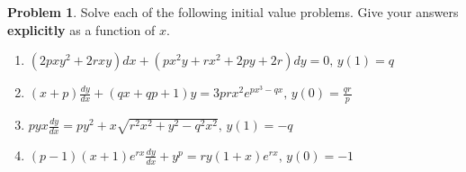 \documentclass[10pt]{article}
\theoremstyle{definition}
\newtheorem{problem}{Problem}
\begin{document}
\newpage
\begin{problem}
Solve each of the following initial value problems. Give your answers \textbf{explicitly} as a function of $x$.
\begin{enumerate}[label=(\alph*)]
  \item $\displaystyle \left(2pxy^2+2rxy\right)dx+\left(px^2y+rx^2+2py+2r\right)dy=0, \, y(1)=q$
  \item $\displaystyle (x+p)\frac{dy}{dx}+(qx+qp+1)y=3prx^2e^{px^3-qx}, \, y(0)=\frac{qr}{p}$
  \item $\displaystyle pyx\frac{dy}{dx}=py^2+x\sqrt{r^2x^2+y^2-q^2x^2}, \, y(1)=-q$
  \item $\displaystyle (p-1)(x+1)e^{rx}\frac{dy}{dx}+y^p=ry(1+x)e^{rx}, \, y(0)=-1$
\end{enumerate}
\begin{center}

\end{center}
\end{problem}
\end{document}
